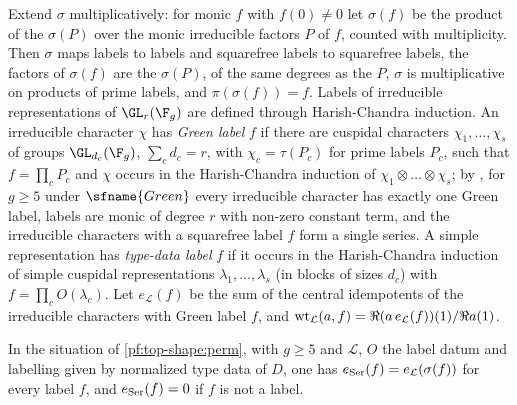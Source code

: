 Extend $\sigma$ multiplicatively: for monic $f$ with $f(0)\ne0$ let $\sigma(f)$ be the product of the $\sigma(P)$
over the monic irreducible factors $P$ of $f$, counted with multiplicity. Then $\sigma$ maps labels to labels and
squarefree labels to squarefree labels, the factors of $\sigma(f)$ are the $\sigma(P)$, of the same degrees as the
$P$, $\sigma$ is multiplicative on products of prime labels, and $\pi(\sigma(f))=f$. Labels of irreducible
representations of $\GL_r(\F_g)$ are defined through Harish-Chandra induction. An irreducible character $\chi$ has
\emph{Green label} $f$ if there are cuspidal characters $\chi_1,\dots,\chi_s$ of groups $\GL_{d_c}(\F_g)$,
$\sum_cd_c=r$, with $\chi_c=\tau(P_c)$ for prime labels $P_c$, such that $f=\prod_cP_c$ and $\chi$ occurs in the
Harish-Chandra induction of $\chi_1\otimes\dots\otimes\chi_s$; by
, for $g\ge5$ under $\sfname{Green}$ every
irreducible character has exactly one Green label, labels are monic of degree $r$ with non-zero constant term, and
the irreducible characters with a squarefree label $f$ form a single series. A simple representation has
\emph{type-data label} $f$ if it occurs in the Harish-Chandra induction of simple cuspidal representations
$\lambda_1,\dots,\lambda_s$ (in blocks of sizes $d_c$) with $f=\prod_cO(\lambda_c)$. Let $e_{\mathcal L}(f)$ be the sum
of the central idempotents of the irreducible characters with Green label $f$, and
$\mathrm{wt}_{\mathcal L}(a,f)=\Re(a\,e_{\mathcal L}(f))(1)/\Re a(1)$.

\begin{lemma}\label{pf:top-shape:eser}
In the situation of \cref{pf:top-shape:perm}, with $g\ge5$ and $\mathcal L$, $O$ the label datum and labelling given
by normalized type data of $D$, one has $e_{\rm Ser}(f)=e_{\mathcal L}(\sigma(f))$ for every label $f$, and
$e_{\rm Ser}(f)=0$ if $f$ is not a label.
\end{lemma}

